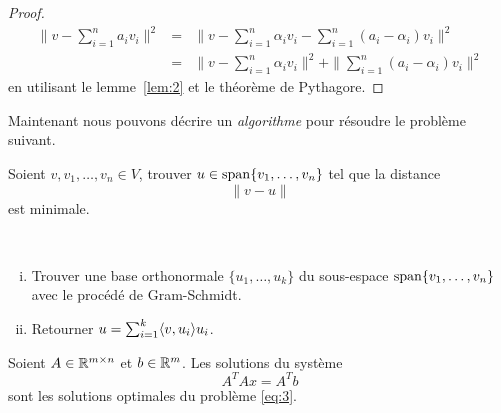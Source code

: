 \begin{proof}
  \begin{eqnarray*}
    \|v- \sum_{i=1}^n a_iv_i \|^2 & = &  \|v - \sum_{i=1}^n \alpha_iv_i  - \sum_{i=1}^n (a_i - \alpha_i)v_i \|^2 \\
                           & = & \|v - \sum_{i=1}^n \alpha_iv_i \|^2 + \| \sum_{i=1}^n (a_i - \alpha_i)v_i \|^2
  \end{eqnarray*}
en utilisant le lemme~\ref{lem:2} et le théorème de Pythagore. 
\end{proof}

\noindent 
Maintenant nous pouvons décrire un \emph{algorithme} pour résoudre le problème suivant. 
\begin{framed}
  \noindent 
  Soient $v,v_1,\dots,v_n \in V$, trouver $u \in \operatorname{span} \{v_1,\dots,v_n\}$ tel que la distance 
  \begin{displaymath}
    \|v - u\|
  \end{displaymath}
  est minimale. 
\end{framed}

\begin{algorithm}
\label{alg:2}

~\\
\begin{enumerate}[i)]
\item Trouver une base orthonormale $\{u_1,\dots,u_k\}$ du sous-espace $\operatorname{span}\{v_1,\dots,v_n\}$ 
  avec le procédé de Gram-Schmidt. 
\item Retourner $ u = \sum_{i=1}^k \langle {v,u_i} \rangle u_i$. 
\end{enumerate}
\end{algorithm}






\begin{theorem}
  \label{thr:6}
  Soient $A \in \mathbb{R}^{m\times n}$ et $b \in \mathbb{R}^m$. Les solutions du système
  \begin{equation}
    \label{eq:4}    
    A^TAx = A^T b
  \end{equation}
  sont les solutions  optimales du problème \eqref{eq:3}. 
\end{theorem}

